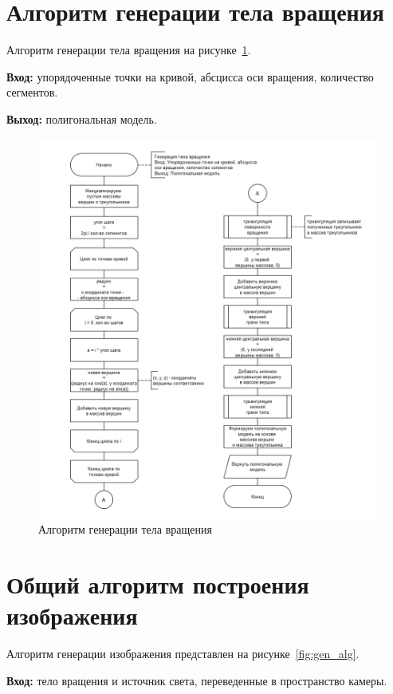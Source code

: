 \section{Алгоритм генерации тела вращения}

Алгоритм генерации тела вращения на рисунке~\ref{fig:gen_body}. 

\textbf{Вход:} упорядоченные точки на кривой, абсцисса оси вращения, количество сегментов. 

\textbf{Выход:} полигональная модель.

\begin{figure}[H]
    \centering
    \includegraphics[width=1\linewidth]{images/diograms/gen_body.png}
    \caption{Алгоритм генерации тела вращения}
    \label{fig:gen_body}
\end{figure}

\section{Общий алгоритм построения изображения}

Алгоритм генерации изображения представлен на рисунке~\ref{fig:gen_alg}. 

\textbf{Вход:} тело вращения и источник света, переведенные в пространство камеры. 


